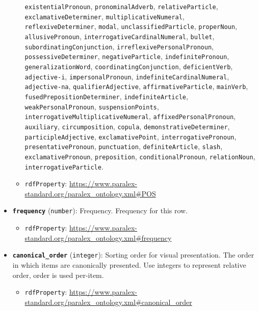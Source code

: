 \begin{itemize}
\begin{itemize}
    \texttt{existentialPronoun}, \texttt{pronominalAdverb},
    \texttt{relativeParticle}, \texttt{exclamativeDeterminer},
    \texttt{multiplicativeNumeral}, \texttt{reflexiveDeterminer},
    \texttt{modal}, \texttt{unclassifiedParticle}, \texttt{properNoun},
    \texttt{allusivePronoun}, \texttt{interrogativeCardinalNumeral},
    \texttt{bullet}, \texttt{subordinatingConjunction},
    \texttt{irreflexivePersonalPronoun}, \texttt{possessiveDeterminer},
    \texttt{negativeParticle}, \texttt{indefinitePronoun},
    \texttt{generalizationWord}, \texttt{coordinatingConjunction},
    \texttt{deficientVerb}, \texttt{adjective-i},
    \texttt{impersonalPronoun}, \texttt{indefiniteCardinalNumeral},
    \texttt{adjective-na}, \texttt{qualifierAdjective},
    \texttt{affirmativeParticle}, \texttt{mainVerb},
    \texttt{fusedPrepositionDeterminer}, \texttt{indefiniteArticle},
    \texttt{weakPersonalPronoun}, \texttt{suspensionPoints},
    \texttt{interrogativeMultiplicativeNumeral},
    \texttt{affixedPersonalPronoun}, \texttt{auxiliary},
    \texttt{circumposition}, \texttt{copula},
    \texttt{demonstrativeDeterminer}, \texttt{participleAdjective},
    \texttt{exclamativePoint}, \texttt{interrogativePronoun},
    \texttt{presentativePronoun}, \texttt{punctuation},
    \texttt{definiteArticle}, \texttt{slash},
    \texttt{exclamativePronoun}, \texttt{preposition},
    \texttt{conditionalPronoun}, \texttt{relationNoun},
    \texttt{interrogativeParticle}.
  \item
    \texttt{rdfProperty}:
    \url{https://www.paralex-standard.org/paralex_ontology.xml\#POS}
  \end{itemize}
\item
  \textbf{\texttt{frequency}} (\texttt{number}): Frequency. Frequency
  for this row.

  \begin{itemize}
  \tightlist
  \item
    \texttt{rdfProperty}:
    \url{https://www.paralex-standard.org/paralex_ontology.xml\#frequency}
  \end{itemize}
\item
  \textbf{\texttt{canonical\_order}} (\texttt{integer}): Sorting order
  for visual presentation. The order in which items are canonically
  presented. Use integers to represent relative order, order is used
  per-item.

  \begin{itemize}
  \tightlist
  \item
    \texttt{rdfProperty}:
    \url{https://www.paralex-standard.org/paralex_ontology.xml\#canonical_order}
  \end{itemize}
\end{itemize}

